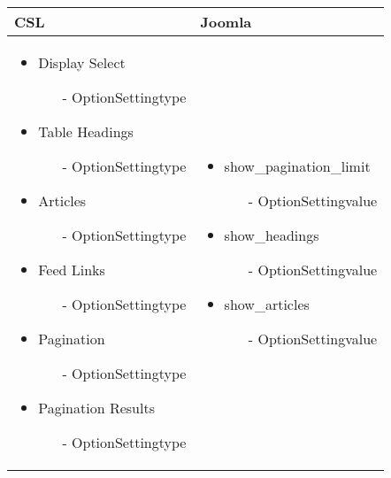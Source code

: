 \begin{minipage}{0.63\textwidth}
\begin{tabular}{|p{} | p{}|}
\hline
\textbf{CSL} & \textbf{Joomla} \\ 
\hline
\begin{itemize}
\item Display Select
\begin{enumerate}
    \item[-] OptionSettingtype
 \end{enumerate} 
\item Table Headings
\begin{enumerate}
    \item[-] OptionSettingtype
 \end{enumerate} 
\item  Articles
\begin{enumerate}
    \item[-] OptionSettingtype
 \end{enumerate} 
\item Feed Links
\begin{enumerate}
    \item[-] OptionSettingtype
 \end{enumerate} 
\item Pagination
\begin{enumerate}
    \item[-] OptionSettingtype
 \end{enumerate} 
\item Pagination Results
\begin{enumerate}
    \item[-] OptionSettingtype
 \end{enumerate} 
\end{itemize}
 & 
\begin{itemize}
\item show\_pagination\_limit
 \begin{enumerate}
    \item[-] OptionSettingvalue
 \end{enumerate} 
\item show\_headings
 \begin{enumerate}
    \item[-] OptionSettingvalue
 \end{enumerate} 
\item show\_articles
 \begin{enumerate}
    \item[-] OptionSettingvalue

\end{enumerate}
\end{itemize}
\end{tabular}
\end{minipage}
